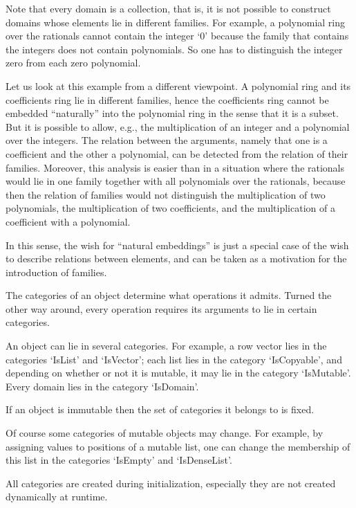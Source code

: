 Note that every domain is a collection, that is,
it is not possible to construct domains whose elements lie in different
families.
For example, a polynomial ring over the rationals cannot contain
the integer `0' because the family that contains the integers
does not contain polynomials.
So one has to distinguish the integer zero from each zero polynomial.

Let us look at this example from a different viewpoint.
A polynomial ring and its coefficients ring lie in different families,
hence the coefficients ring cannot be embedded ``naturally'' into the
polynomial ring in the sense that it is a subset.
But it is possible to allow, e.g., the multiplication of an integer
and a polynomial over the integers.
The relation between the arguments,
namely that one is a coefficient and the other a polynomial,
can be detected from the relation of their families.
Moreover, this analysis is easier than in a situation where the rationals
would lie in one family together with all polynomials over the rationals,
because then the relation of families would not distinguish
the multiplication of two polynomials,
the multiplication of two coefficients,
and the multiplication of a coefficient with a polynomial.

In this sense, the wish for ``natural embeddings'' is just a special case
of the wish to describe relations between elements,
and can be taken as a motivation for the introduction of families.


The categories of an object determine what operations it admits.
Turned the other way around, every operation requires its arguments
to lie in certain categories.

An object can lie in several categories.
For example, a row vector lies in the categories `IsList' and `IsVector';
each list lies in the category `IsCopyable',
and depending on whether or not it is mutable, it may lie in the category
`IsMutable'.
Every domain lies in the category `IsDomain'.

If an object is immutable then the set of categories it belongs to is
fixed.

Of course some categories of mutable objects may change.
For example, by assigning values to positions of a mutable list,
one can change the membership of this list in the categories `IsEmpty'
and `IsDenseList'.

All categories are created during initialization,
especially they are not created dynamically at runtime.

